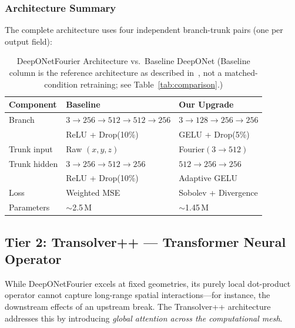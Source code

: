 \documentclass[journal]{IEEEtran}
\begin{document}
\subsubsection{Architecture Summary}
The complete architecture uses four independent branch-trunk pairs (one per output field):

\begin{table}[htbp]
\caption{DeepONetFourier Architecture vs.\ Baseline DeepONet (Baseline column is the reference architecture as described in~\cite{lu2021deeponet}, not a matched-condition retraining; see Table~\ref{tab:comparison}.)}
\label{tab:arch}
\centering
\begin{tabular}{lll}
\toprule
\textbf{Component} & \textbf{Baseline} & \textbf{Our Upgrade} \\
\midrule
Branch & $3{\to}256{\to}512{\to}512{\to}256$ & $3{\to}128{\to}256{\to}256$ \\
 & ReLU + Drop(10\%) & GELU + Drop(5\%) \\
\midrule
Trunk input & Raw $(x,y,z)$ & Fourier$(3{\to}512)$ \\
Trunk hidden & $3{\to}256{\to}512{\to}256$ & $512{\to}256{\to}256$ \\
 & ReLU + Drop(10\%) & Adaptive GELU \\
\midrule
Loss & Weighted MSE & Sobolev + Divergence \\
Parameters & $\sim$2.5\,M & $\sim$1.45\,M \\
\bottomrule
\end{tabular}
\end{table}

\subsection{Tier 2: Transolver++ --- Transformer Neural Operator}
\label{sec:transolver}

While DeepONetFourier excels at fixed geometries, its purely local dot-product operator cannot capture long-range spatial interactions---for instance, the downstream effects of an upstream break. The Transolver++ architecture \cite{wu2024transolver} addresses this by introducing \emph{global attention across the computational mesh}.
\end{document}
